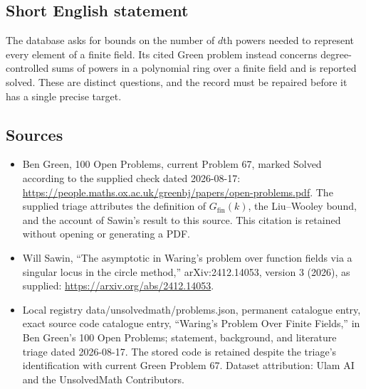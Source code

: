 \documentclass[11pt]{article}
\begin{document}
\subsection{Short English statement}
The database asks for bounds on the number of $d$th powers needed to represent every element of a finite field. Its cited Green problem instead concerns degree-controlled sums of powers in a polynomial ring over a finite field and is reported solved. These are distinct questions, and the record must be repaired before it has a single precise target.
\subsection{Sources}
\begin{itemize}
\item Ben Green, 100 Open Problems, current Problem 67, marked Solved according to the supplied check dated 2026-08-17: \url{https://people.maths.ox.ac.uk/greenbj/papers/open-problems.pdf}. The supplied triage attributes the definition of $G_{\mathrm{fin}}(k)$, the Liu--Wooley bound, and the account of Sawin's result to this source. This citation is retained without opening or generating a PDF.
\item Will Sawin, ``The asymptotic in Waring's problem over function fields via a singular locus in the circle method,'' arXiv:2412.14053, version 3 (2026), as supplied: \url{https://arxiv.org/abs/2412.14053}.
\item Local registry data/unsolvedmath/problems.json, permanent catalogue entry, exact source code catalogue entry, ``Waring's Problem Over Finite Fields,'' in Ben Green's 100 Open Problems; statement, background, and literature triage dated 2026-08-17. The stored code is retained despite the triage's identification with current Green Problem 67. Dataset attribution: Ulam AI and the UnsolvedMath Contributors.
\end{itemize}
\end{document}
